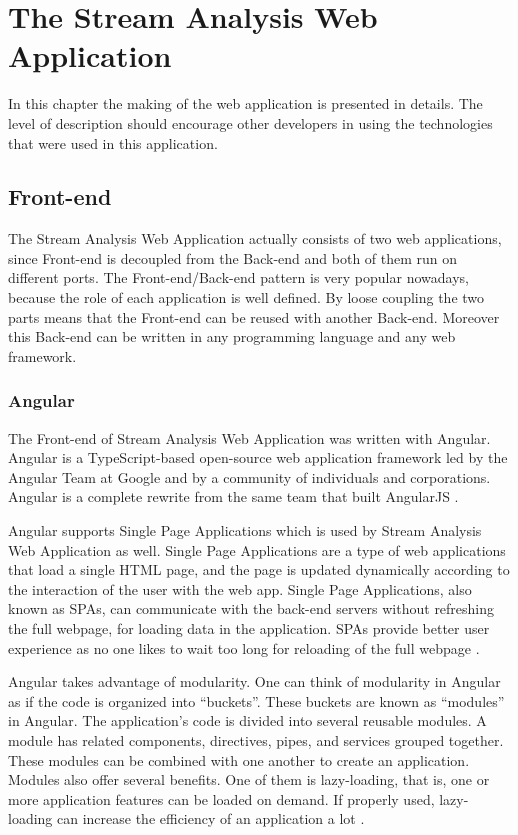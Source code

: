 \chapter{The Stream Analysis Web Application}
\label{chap:04}
In this chapter the making of the web application is presented in details. The level of description should encourage other developers in using the technologies that were used in this application.

\section{Front-end}
\label{chap:04:01}

The Stream Analysis Web Application actually consists of two web applications, since Front-end is decoupled from the Back-end and both of them run on different ports. The Front-end/Back-end pattern is very popular nowadays, because the role of each application is well defined. By loose coupling the two parts means that the Front-end can be reused with another Back-end. Moreover this Back-end can be written in any programming language and any web framework.

\subsection{Angular}
\label{chap:04:01:01}

The Front-end of Stream Analysis Web Application was written with Angular. Angular is a TypeScript-based open-source web application framework led by the Angular Team at Google and by a community of individuals and corporations. Angular is a complete rewrite from the same team that built AngularJS \cite{angular-description}.

Angular supports Single Page Applications which is used by Stream Analysis Web Application as well. Single Page Applications are a type of web applications that load a single HTML page, and the page is updated dynamically according to the interaction of the user with the web app. Single Page Applications, also known as SPAs, can communicate with the back-end servers without refreshing the full webpage, for loading data in the application. SPAs provide better user experience as no one likes to wait too long for reloading of the full webpage \cite{why-learn-angular}.

Angular takes advantage of modularity. One can think of modularity in Angular as if the code is organized into “buckets”. These buckets are known as “modules” in Angular. The application’s code is divided into several reusable modules. A module has related components, directives, pipes, and services grouped together. These modules can be combined with one another to create an application. Modules also offer several benefits. One of them is lazy-loading, that is, one or more application features can be loaded on demand. If properly used, lazy-loading can increase the efficiency of an application a lot \cite{why-learn-angular}\cite{angular-book1}.

